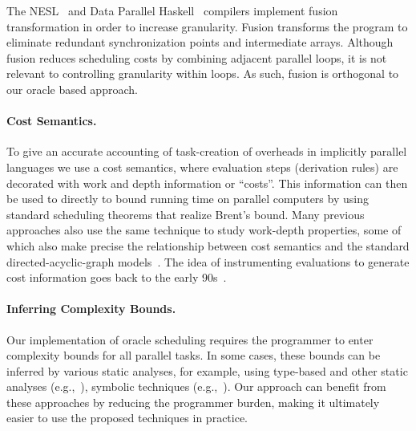 The NESL~\cite{nesl-implement} and Data Parallel
Haskell~\cite{PeytonJones08} compilers implement fusion transformation
in order to increase granularity. Fusion transforms the program to
eliminate redundant synchronization points and intermediate
arrays. Although fusion reduces scheduling costs by combining adjacent
parallel loops, it is not relevant to controlling granularity within
loops. As such, fusion is orthogonal to our oracle based approach.

\paragraph{Cost Semantics.}
To give an accurate accounting of task-creation of overheads in
implicitly parallel languages we use a cost semantics, where
evaluation steps (derivation rules) are decorated with work and depth
information or ``costs''.  This information can then be used to
directly to bound running time on parallel computers by using standard
scheduling theorems that realize Brent's bound.  Many previous
approaches also use the same technique to study work-depth properties,
some of which also make precise the relationship between cost
semantics and the standard directed-acyclic-graph
models~\cite{BlellochGr95,BlellochGr96,SpoonhowerBlHaGi08}. The idea
of instrumenting evaluations to generate cost information goes back to
the early 90s~\cite{Sands-thesis,Rosendahl89}.  

\paragraph{Inferring Complexity Bounds.}
Our implementation of oracle scheduling requires the programmer to
enter complexity bounds for all parallel tasks.  In some cases, these
bounds can be inferred by various static analyses, for example, using
type-based and other static analyses
(e.g.,~\cite{CraryWe00,JostHaLoHo10}), symbolic
techniques
(e.g.,~\cite{GoldsmithAiWi07,GulwaniMeCh09}). Our
approach can benefit from these approaches by reducing the programmer
burden, making it ultimately easier to use the proposed techniques in
practice.
 






